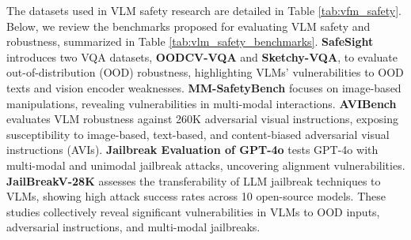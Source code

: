 The datasets used in VLM safety research are detailed in Table \ref{tab:vfm_safety}. Below, we review the benchmarks proposed for evaluating VLM safety and robustness, summarized in Table \ref{tab:vlm_safety_benchmarks}.
\textbf{SafeSight} \cite{tu2023many} introduces two VQA datasets, \textbf{OODCV-VQA} and \textbf{Sketchy-VQA}, to evaluate out-of-distribution (OOD) robustness, highlighting VLMs' vulnerabilities to OOD texts and vision encoder weaknesses. \textbf{MM-SafetyBench} \cite{liu2023mm} focuses on image-based manipulations, revealing vulnerabilities in multi-modal interactions. \textbf{AVIBench} \cite{zhang2024avibench} evaluates VLM robustness against 260K adversarial visual instructions, exposing susceptibility to image-based, text-based, and content-biased  adversarial visual instructions (AVIs). \textbf{Jailbreak Evaluation of GPT-4o} \cite{ying2024unveiling} tests GPT-4o with multi-modal and unimodal jailbreak attacks, uncovering alignment vulnerabilities. \textbf{JailBreakV-28K} \cite{luo2024jailbreakv} assesses the transferability of LLM jailbreak techniques to VLMs, showing high attack success rates across 10 open-source models. These studies collectively reveal significant vulnerabilities in VLMs to OOD inputs, adversarial instructions, and multi-modal jailbreaks.

